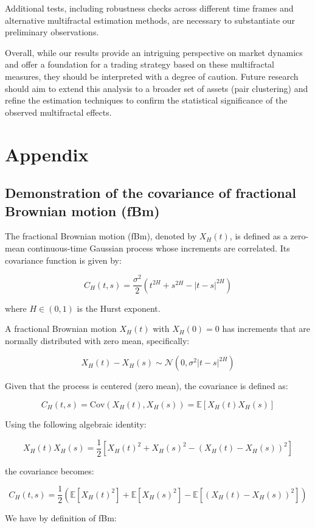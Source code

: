 \documentclass[11pt]{extarticle}
\begin{document}
Additional tests, including robustness checks across different time frames and alternative multifractal estimation
methods, are necessary to substantiate our preliminary observations.

Overall, while our results provide an intriguing perspective on market dynamics and offer a foundation for a trading
strategy based on these multifractal measures, they should be interpreted with a degree of caution. Future research
should aim to extend this analysis to a broader set of assets (pair clustering) and refine the estimation techniques
to confirm the statistical significance of the observed multifractal effects.

\section{Appendix}

\subsection{Demonstration of the covariance of fractional Brownian motion (fBm)}
\label{sec:covariance_fbm}

The fractional Brownian motion (fBm), denoted by \( X_H(t) \), is defined as a zero-mean continuous-time Gaussian process whose increments are correlated. Its covariance function is given by:

\[
C_H(t,s) = \frac{\sigma^2}{2}\left(t^{2H}+s^{2H}-|t-s|^{2H}\right)
\]

where \( H \in (0,1) \) is the Hurst exponent.

A fractional Brownian motion \( X_H(t) \) with \( X_H(0)=0 \) has increments that are normally distributed with zero mean, specifically:

\[
X_H(t)-X_H(s) \sim \mathcal{N}(0,\sigma^2|t-s|^{2H})
\]

Given that the process is centered (zero mean), the covariance is defined as:

\[
C_H(t,s) = \text{Cov}(X_H(t), X_H(s)) = \mathbb{E}[X_H(t)X_H(s)]
\]

Using the following algebraic identity:

\[
X_H(t)X_H(s) = \frac{1}{2}\left[X_H(t)^2 + X_H(s)^2 - (X_H(t)-X_H(s))^2\right]
\]

the covariance becomes:

\[
C_H(t,s) = \frac{1}{2}\left(\mathbb{E}[X_H(t)^2]+\mathbb{E}[X_H(s)^2]-\mathbb{E}[(X_H(t)-X_H(s))^2]\right)
\]


We have by definition of fBm:
\end{document}
